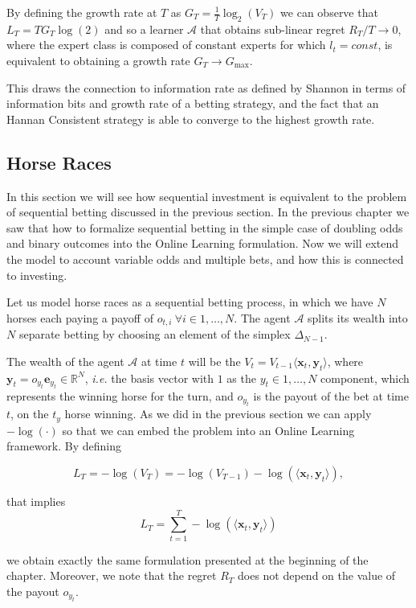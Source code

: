 By defining the growth rate at $T$ as $G_T=\frac{1}{T}\log_2(V_T)$ we can observe that $L_T=TG_T\log(2)$ and so a learner $\mathcal A$ that obtains sub-linear regret $R_T/T\to0$, where the expert class is composed of constant experts for which $l_t=const$, is equivalent to obtaining a growth rate $G_T\to G_{\max}$.

This draws the connection to information rate as defined by Shannon in terms of information bits and growth rate of a betting strategy, and the fact that an Hannan Consistent strategy is able to converge to the highest growth rate. 

\subsection{Horse Races}

In this section we will see how sequential investment is equivalent to the problem of sequential betting discussed in the previous section.
In the previous chapter we saw that how to formalize sequential betting in the simple case of doubling odds and binary outcomes into the Online Learning formulation. Now we will extend the model to account variable odds and multiple bets, and how this is connected to investing.

Let us model horse races as a sequential betting process, in which we have $N$ horses each paying a payoff of $o_{t,i}\ \forall i\in 1,\ldots,N$. The agent $\mathcal A$ splits its wealth into $N$ separate betting by choosing an element of the simplex $\Delta_{N-1}$.

The wealth of the agent $\mathcal A$ at time $t$ will be the $V_t=V_{t-1}\langle \mathbf x_t, \mathbf y_t \rangle$, where $\mathbf y_t=o_{y_t}\mathbf e_{y_t}\in\mathbb R^N$, \emph{i.e.} the basis vector with $1$ as the $y_t\in1,\ldots,N$ component, which represents the winning horse for the turn, and $o_{y_t}$ is the payout of the bet at time $t$, on the $t_y$ horse winning. As we did in the previous section we can apply $-\log(\cdot)$ so that we can embed the problem into an Online Learning framework. By defining 

$$L_T=-\log(V_T)=-\log(V_{T-1})-\log(\langle \mathbf x_t,\mathbf y_t\rangle),$$

that implies 
\begin{equation}\label{eq:log_loss_hr}
L_T=\sum\limits_{t=1}^T-\log(\langle \mathbf x_t,\mathbf y_t\rangle)
\end{equation}

we obtain exactly the same formulation presented at the beginning of the chapter. Moreover, we note that the regret $R_T$ does not 
depend on the value of the payout $o_{y_t}$. 

